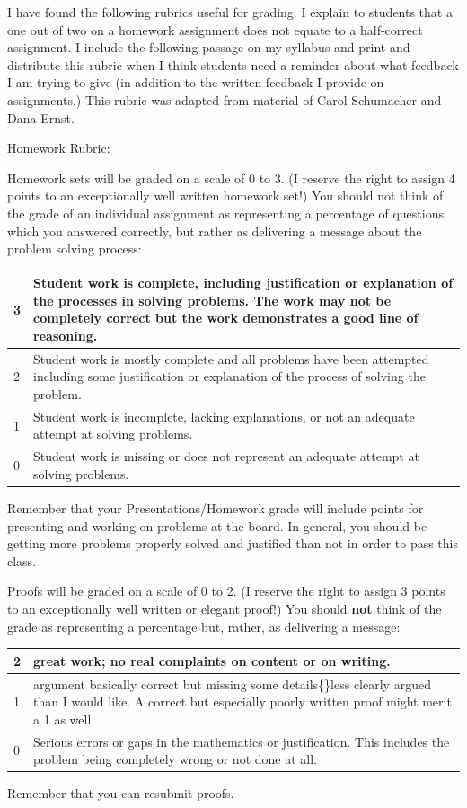 \begin{annotation}
I have found the following rubrics useful for grading.  I explain to students that a one out of two on a homework assignment does not equate to a half-correct assignment. I include the following passage on my syllabus and print and distribute this rubric when I think students need a reminder about what feedback I am trying to give (in addition to the written feedback I provide on assignments.) This rubric was adapted from material of Carol Schumacher and Dana Ernst.

Homework Rubric:

Homework sets will be graded on a scale of 0 to 3. (I reserve the right to assign 4 points to an exceptionally well written homework set!) You should not think of the grade of an individual assignment as representing a percentage of questions which you answered correctly, but rather as delivering a message about the problem solving process:
\newline
\begin{tabular}{|l|p{11cm}|}
\hline
3 & Student work is complete, including justification or explanation of the processes in solving problems. The work may not be completely correct but the work demonstrates a good line of reasoning. \\
\hline
2 & Student work is mostly complete and all problems have been attempted including some justification or explanation of the process of solving the problem.\\
\hline
1 & Student work is incomplete, lacking explanations, or not an adequate attempt at solving problems. \\
\hline
0 & Student work is missing or does not represent an adequate attempt at solving problems. \\
\hline
\end{tabular}

Remember that your Presentations/Homework grade will include points for presenting and working on problems at the board. In general, you should be getting more problems properly solved and justified than not in order to pass this class.

Proofs will be graded on a scale of 0 to 2. (I reserve the right to assign 3 points to an exceptionally well written or elegant proof!) You should \textbf{not} think of the grade as representing a percentage but, rather, as delivering a message:
\newline
\begin{tabular}{|l|p{11cm}|}
\hline
2 & great work; no real complaints on content or on writing.\\
\hline
1 & argument basically correct but missing some details\{\}less clearly argued than I would like. A correct but especially poorly written proof might merit a 1 as well.\\
\hline
0 & Serious errors or gaps in the mathematics or justification. This includes the problem being completely wrong or not done at all.\\
\hline
\end{tabular}

Remember that you can resubmit proofs.

\end{annotation}

